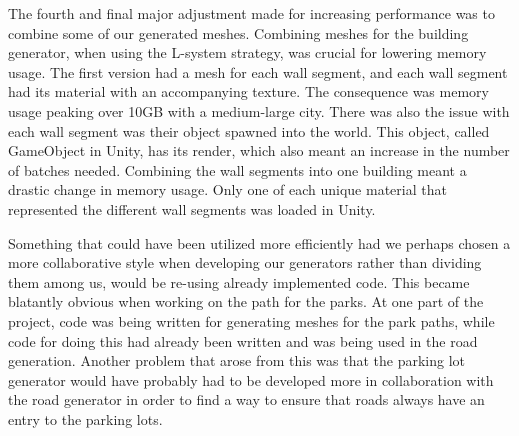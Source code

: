 The fourth and final major adjustment made for increasing performance was to combine some of our generated meshes. 
Combining meshes for the building generator, when using the L-system strategy, was crucial for lowering memory usage. 
The first version had a mesh for each wall segment, and each wall segment had its material with an accompanying texture. 
The consequence was memory usage peaking over 10GB with a medium-large city. 
There was also the issue with each wall segment was their object spawned into the world.
This object, called GameObject in Unity, has its render, which also meant an increase in the number of batches needed.
Combining the wall segments into one building meant a drastic change in memory usage. 
Only one of each unique material that represented the different wall segments was loaded in Unity.   


Something that could have been utilized more efficiently had we perhaps chosen a more collaborative style when developing our generators rather than dividing them among us, would be re-using already implemented code. 
This became blatantly obvious when working on the path for the parks.
At one part of the project, code was being written for generating meshes for the park paths, while code for doing this had already been written and was being used in the road generation. 
Another problem that arose from this was that the parking lot generator would have probably had to be developed more in collaboration with the road generator in order to find a way to ensure that roads always have an entry to the parking lots.


